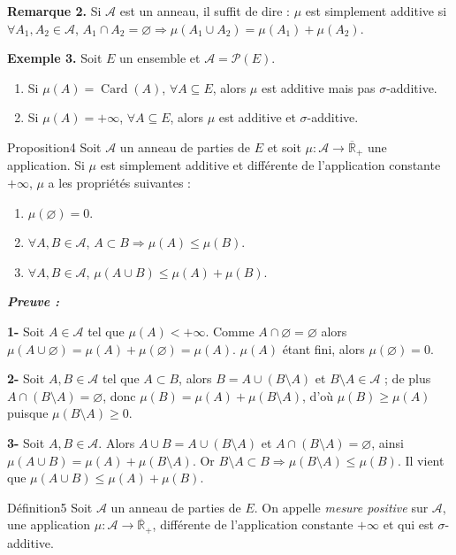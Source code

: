 \documentclass[11pt,a4paper]{article}
\newcommand{\Rb}{\overline{\mathbb{R}}}
\newcommand{\A}{\mathscr{A}}
\newcommand{\Pp}{\mathscr{P}}
\newenvironment{preuve}{\par\textit{\textbf{Preuve :}}\par\nopagebreak[4]}{\par}
\begin{document}
\textbf{\color{bleu}Remarque 2.}
Si $\A$ est un anneau, il suffit de dire : $\mu$ est simplement additive si
$\forall A_1,A_2\in\A$, $A_1\cap A_2=\varnothing\Rightarrow\mu(A_1\cup A_2)=\mu(A_1)+\mu(A_2)$.

\textbf{\color{bleu}Exemple 3.} Soit $E$ un ensemble et $\A=\Pp(E)$.
\begin{enumerate}[label=\textbf{\arabic*-},leftmargin=1.2cm]
  \item Si $\mu(A)=\operatorname{Card}(A)$, $\forall A\subseteq E$, alors $\mu$ est additive mais pas $\sigma$-additive.
  \item Si $\mu(A)=+\infty$, $\forall A\subseteq E$, alors $\mu$ est additive et $\sigma$-additive.
\end{enumerate}

\begin{enonce}{Proposition}{4}
Soit $\A$ un anneau de parties de $E$ et soit $\mu:\A\to\Rb_+$ une application. Si $\mu$ est simplement additive et différente de
l'application constante $+\infty$, $\mu$ a les propriétés suivantes :
\begin{enumerate}[label=\textbf{\arabic*-},leftmargin=1.2cm]
  \item $\mu(\varnothing)=0$.
  \item $\forall A,B\in\A$, $A\subset B\Rightarrow\mu(A)\le\mu(B)$.
  \item $\forall A,B\in\A$, $\mu(A\cup B)\le\mu(A)+\mu(B)$.
\end{enumerate}
\end{enonce}

\begin{preuve}\end{preuve}
\textbf{1-} Soit $A\in\A$ tel que $\mu(A)<+\infty$. Comme $A\cap\varnothing=\varnothing$ alors
$\mu(A\cup\varnothing)=\mu(A)+\mu(\varnothing)=\mu(A)$. $\mu(A)$ étant fini, alors $\mu(\varnothing)=0$.

\textbf{2-} Soit $A,B\in\A$ tel que $A\subset B$, alors $B=A\cup(B\setminus A)$ et $B\setminus A\in\A$ ;
de plus $A\cap(B\setminus A)=\varnothing$, donc $\mu(B)=\mu(A)+\mu(B\setminus A)$, d'où $\mu(B)\ge\mu(A)$ puisque $\mu(B\setminus A)\ge0$.

\textbf{3-} Soit $A,B\in\A$. Alors $A\cup B=A\cup(B\setminus A)$ et $A\cap(B\setminus A)=\varnothing$, ainsi
$\mu(A\cup B)=\mu(A)+\mu(B\setminus A)$. Or $B\setminus A\subset B\Rightarrow\mu(B\setminus A)\le\mu(B)$.
Il vient que $\mu(A\cup B)\le\mu(A)+\mu(B)$.

\begin{enonce}{Définition}{5}
Soit $\A$ un anneau de parties de $E$. On appelle \emph{mesure positive} sur $\A$, une application $\mu:\A\to\Rb_+$, différente de
l'application constante $+\infty$ et qui est $\sigma$-additive.
\end{enonce}
\end{document}
